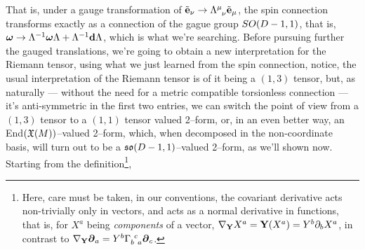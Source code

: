 That is, under a gauge transformation of $\tilde{\vb e}_\nu\rightarrow\tensor{\Lambda}{^\mu_\nu}\tilde{\vb e}_\mu$, the spin connection transforms exactly as a connection of the gague group $SO\qty(D-1,1)$, that is, 
$\boldsymbol \omega\rightarrow \Lambda^{-1}\boldsymbol\omega\Lambda+\Lambda^{-1}\vb d{\Lambda}$, which is what we're searching. Before pursuing further the gauged translations, we're going to obtain a new interpretation 
for the Riemann tensor, using what we just learned from the spin connection, notice, the usual interpretation of the Riemann tensor is of it being a $(1,3)$ tensor, but, as naturally --- without the need for a metric compatible 
torsionless connection --- it's anti-symmetric in the first two entries, we can switch the point of view from a $(1,3)$ tensor to a $(1,1)$ tensor valued 2--form, or, in an even better way, an End$\qty(\mathfrak X\qty(M))$--valued 2--form, 
which, when decomposed in the non-coordinate basis, will turn out to be a $\mathfrak{so}\qty(D-1,1)$--valued 2--form, as we'll shown now. Starting from the definition\footnote{Here, care must be taken, in our conventions, the covariant derivative acts non-trivially only 
in vectors, and acts as a normal derivative in functions, that is, for $X^a$ being \textit{components} of a vector, $\nabla_{\vb Y}X^a=\vb Y\qty(X^a)=Y^b\partial_b X^a$, in contrast to $\nabla_{\vb Y}\boldsymbol\partial_a=Y^b\tensor{\Gamma}{_b^c_a}\boldsymbol\partial_c$.},
